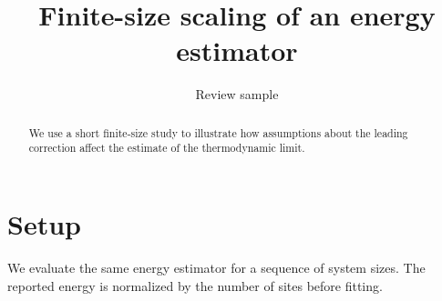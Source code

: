 \documentclass[11pt]{article}
\title{Finite-size scaling of an energy estimator}
\author{Review sample}
\date{}
\begin{document}
\maketitle
\begin{abstract}
We use a short finite-size study to illustrate how assumptions about the
leading correction affect the estimate of the thermodynamic limit.
\end{abstract}

\section{Setup}
We evaluate the same energy estimator for a sequence of system sizes.
The reported energy is normalized by the number of sites before fitting.


\end{document}

